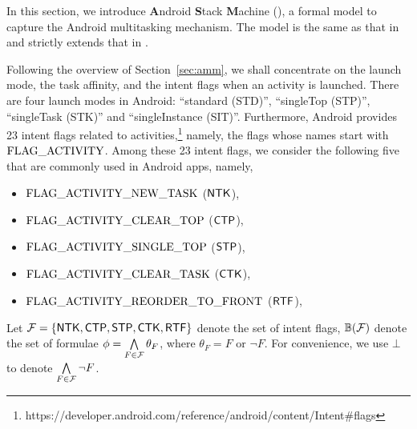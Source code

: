 
In this section, we introduce \textbf{A}ndroid \textbf{S}tack \textbf{M}achine (\AMASS), a formal model to capture the Android multitasking mechanism. The {\AMASS} model is the same as that in \cite{HCWWY19} and strictly extends that in \cite{ChenHSWWY18}.  

Following the overview of Section~\ref{sec:amm}, we shall concentrate on the launch mode, the task affinity, and the intent flags when an activity is launched.  There are four launch modes in Android: ``standard (STD)'', ``singleTop (STP)'', ``singleTask (STK)'' and ``singleInstance (SIT)''.  
Furthermore, Android provides 23 intent flags related to activities,\footnote{https://developer.android.com/reference/android/content/Intent\#flags}
namely, the flags whose names start with $\rm FLAG\_ACTIVITY$. %
Among these 23 intent flags, we consider the following five that are commonly used in Android apps, namely,
\begin{itemize}
	\item $\rm FLAG\_ACTIVITY\_NEW\_TASK$ (${\sf NTK}$),
	\item $\rm FLAG\_ACTIVITY\_CLEAR\_TOP$ (${\sf CTP}$),
	\item $\rm  FLAG\_ACTIVITY\_SINGLE\_TOP$ (${\sf STP}$),
	\item $\rm  FLAG\_ACTIVITY\_CLEAR\_TASK$ (${\sf CTK}$),
	\item $\rm FLAG\_ACTIVITY\_REORDER\_TO\_FRONT$ (${\sf RTF}$),
\end{itemize}

Let $\mathcal{F}=\{{\sf NTK}, {\sf CTP}, {\sf STP}, {\sf CTK}, {\sf RTF} \}$ denote the set of intent flags, $\mathbb{B}(\mathcal{F})$ denote the set of formulae $\phi = \bigwedge \limits_{F \in \mathcal{F}} \theta_F$, where $\theta_F = F$ or $\neg F$. For convenience, we use $\bot$ to denote $ \bigwedge \limits_{F \in \mathcal{F}} \neg F$. 

